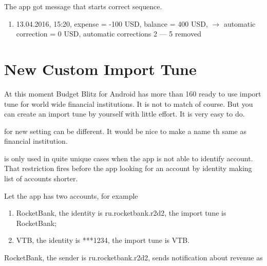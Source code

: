 \documentclass[a4paper,10pt,english]{sphinxmanual}
\begin{document}
The app got message that starts correct sequence.
\begin{enumerate}
\def\theenumi{\arabic{enumi}}
\def\labelenumi{\theenumi .}
\makeatletter\def\p@enumii{\p@enumi \theenumi .}\makeatother
\setcounter{enumi}{5}
\item {} 
13.04.2016, 15:20, expense = -100 USD, balance = 400 USD, \(\rightarrow\) automatic correction  = 0 USD, automatic corrections  2 — 5 removed

\end{enumerate}


\section{New Custom Import Tune}
\label{\detokenize{notifications:new-custom-import-tune}}
At this moment Budget Blitz for Android has more than 160 ready to use import tune for world wide financial institutions.
It is not to match of course. But you can create an import tune by yourself with little effort.
It is very easy to do.

\noindent{}
\noindent{}
\noindent{}

 for new setting can be different. It would be nice to make a name th same as
financial institution.

 is only used in quite unique cases when the app is not able
to identify account. That restriction fires before the app looking for an account by identity making list
of accounts shorter.

Let the app has two accounts, for example
\begin{enumerate}
\def\theenumi{\arabic{enumi}}
\def\labelenumi{\theenumi .}
\makeatletter\def\p@enumii{\p@enumi \theenumi .}\makeatother
\item {} 
RocketBank, the identity is ru.rocketbank.r2d2, the import tune is RocketBank;

\item {} 
VTB, the identity is ***1234, the import tune is VTB.

\end{enumerate}

RocketBank, the sender is ru.rocketbank.r2d2, sends notification about revenue as
\end{document}
